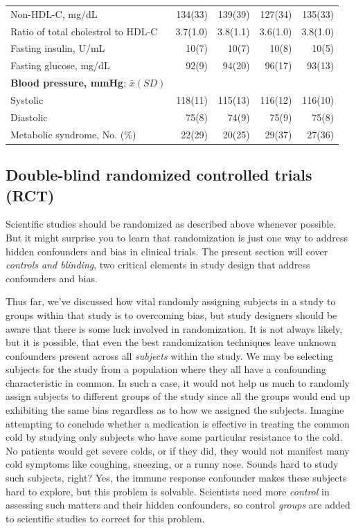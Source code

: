 \documentclass[11pt, chapterprefix=true]{scrbook}\usepackage[]{graphicx}\usepackage[]{color}
\begin{document}
\begin{table}[ht]
\begin{tabular}{@{} lrrrr @{}}
Non-HDL-C, mg/dL       & 134(33) & 139(39) & 127(34) & 135(33) \\
Ratio of total cholestrol to HDL-C & 3.7(1.0) & 3.8(1.1) & 3.6(1.0) & 3.8(1.0) \\
Fasting insulin, U/mL & 10(7) & 10(7) & 10(8) & 10(5) \\
Fasting glucose, mg/dL & 92(9) & 94(20) & 96(17) & 93(13) \\
\textbf{Blood pressure, mmHg}; $\bar{x} (SD)$ & & & & \\
Systolic & 118(11) & 115(13) & 116(12) & 116(10) \\
Diastolic & 75(8) & 74(9) & 75(9) & 75(8) \\
Metabolic syndrome, No. (\%) & 22(29) & 20(25) & 29(37) & 27(36) \\ \hline
\end{tabular}
  \label{tbl51}
\end{table}

\subsection{Double-blind randomized controlled trials (RCT)}

Scientific studies should be randomized as described above whenever possible. But it might surprise you to learn that randomization is just one way to address hidden confounders and bias in clinical trials. The present section will cover \textit{controls and blinding}, two critical elements in study design that address confounders and bias.

Thus far, we’ve discussed how vital randomly assigning subjects in a study to groups within that study is to overcoming bias, but study designers should be aware that there is some luck involved in randomization. It is not always likely, but it is possible, that even the best randomization techniques leave unknown confounders present across all \textit{subjects} within the study. We may be selecting subjects for the study from a population where they all have a confounding characteristic in common. In such a case, it would not help us much to randomly assign subjects to different groups of the study since all the groups would end up exhibiting the same bias regardless as to how we assigned the subjects. Imagine attempting to conclude whether a medication is effective in treating the common cold by studying only subjects who have some particular resistance to the cold. No patients would get severe colds, or if they did, they would not manifest many cold symptoms like coughing, sneezing, or a runny nose. Sounds hard to study such subjects, right? Yes, the immune response confounder makes these subjects hard to explore, but this problem is solvable. Scientists need more \textit{control} in assessing such matters and their hidden confounders, so control \textit{groups} are added to scientific studies to correct for this problem.
\end{document}
